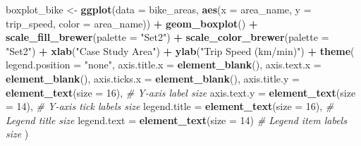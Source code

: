 \documentclass[
]{article}
\newenvironment{Shaded}{\begin{snugshade}}{\end{snugshade}}
\newcommand{\AttributeTok}[1]{\textcolor[rgb]{0.13,0.29,0.53}{#1}}
\newcommand{\CommentTok}[1]{\textcolor[rgb]{0.56,0.35,0.01}{\textit{#1}}}
\newcommand{\DecValTok}[1]{\textcolor[rgb]{0.00,0.00,0.81}{#1}}
\newcommand{\FunctionTok}[1]{\textcolor[rgb]{0.13,0.29,0.53}{\textbf{#1}}}
\newcommand{\NormalTok}[1]{#1}
\newcommand{\OtherTok}[1]{\textcolor[rgb]{0.56,0.35,0.01}{#1}}
\newcommand{\SpecialCharTok}[1]{\textcolor[rgb]{0.81,0.36,0.00}{\textbf{#1}}}
\newcommand{\StringTok}[1]{\textcolor[rgb]{0.31,0.60,0.02}{#1}}
\begin{document}
\begin{Shaded}
\begin{Highlighting}[]
\NormalTok{boxplot\_bike }\OtherTok{\textless{}{-}} \FunctionTok{ggplot}\NormalTok{(}\AttributeTok{data =}\NormalTok{ bike\_areas, }\FunctionTok{aes}\NormalTok{(}\AttributeTok{x =}\NormalTok{ area\_name, }\AttributeTok{y =}\NormalTok{ trip\_speed, }\AttributeTok{color =}\NormalTok{ area\_name)) }\SpecialCharTok{+} 
  \FunctionTok{geom\_boxplot}\NormalTok{() }\SpecialCharTok{+} 
  \FunctionTok{scale\_fill\_brewer}\NormalTok{(}\AttributeTok{palette =} \StringTok{"Set2"}\NormalTok{) }\SpecialCharTok{+} 
  \FunctionTok{scale\_color\_brewer}\NormalTok{(}\AttributeTok{palette =} \StringTok{"Set2"}\NormalTok{) }\SpecialCharTok{+} 
  \FunctionTok{xlab}\NormalTok{(}\StringTok{"Case Study Area"}\NormalTok{) }\SpecialCharTok{+} 
  \FunctionTok{ylab}\NormalTok{(}\StringTok{"Trip Speed (km/min)"}\NormalTok{) }\SpecialCharTok{+} 
  \FunctionTok{theme}\NormalTok{(}
    \AttributeTok{legend.position =} \StringTok{"none"}\NormalTok{, }
    \AttributeTok{axis.title.x =} \FunctionTok{element\_blank}\NormalTok{(), }
    \AttributeTok{axis.text.x =} \FunctionTok{element\_blank}\NormalTok{(), }
    \AttributeTok{axis.ticks.x =} \FunctionTok{element\_blank}\NormalTok{(),}
    \AttributeTok{axis.title.y =} \FunctionTok{element\_text}\NormalTok{(}\AttributeTok{size =} \DecValTok{16}\NormalTok{),      }\CommentTok{\# Y{-}axis label size}
    \AttributeTok{axis.text.y =} \FunctionTok{element\_text}\NormalTok{(}\AttributeTok{size =} \DecValTok{14}\NormalTok{),       }\CommentTok{\# Y{-}axis tick labels size}
    \AttributeTok{legend.title =} \FunctionTok{element\_text}\NormalTok{(}\AttributeTok{size =} \DecValTok{16}\NormalTok{),      }\CommentTok{\# Legend title size}
    \AttributeTok{legend.text =} \FunctionTok{element\_text}\NormalTok{(}\AttributeTok{size =} \DecValTok{14}\NormalTok{)        }\CommentTok{\# Legend item labels size}
\NormalTok{  )}


\end{Highlighting}
\end{Shaded}
\end{document}
